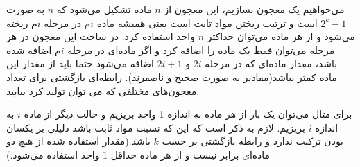 \p 
    می‌خواهیم یک معجون بسازیم،
    این معجون از 
    $n$
    ماده تشکیل می‌شود که
    $n$
    به صورت
    $2^{k}-1$
    است و ترتیب ریختن مواد ثابت است یعنی همیشه ماده 
    $i$م
    در مرحله 
    $i$م
    ریخته می‌شود
    و از هر ماده می‌توان حداکثر 
    $n$
    واحد استفاده کرد.
    در ساخت این معجون در هر مرحله می‌توان فقط یک ماده را اضافه کرد و اگر ماده‌ای در مرحله
    $i‌$م
    اضافه شده باشد، مقدار ماده‌ای که در مرحله 
    $2i$
    و
    $2i+1$
    اضافه می‌شود حتما باید از مقدار این ماده کمتر نباشد(مقادیر به صورت صحیح و ناصفرند).
    رابطه‌ای بازگشتی برای تعداد معجون‌های مختلفی که می توان تولید کرد بیابید.


    برای مثال می‌توان یک بار از هر ماده به اندازه 1 واحد بریزیم و حالت دیگر از ماده
    $i$ به اندازه $i$ بریزیم. لازم به ذکر است که این که نسبت مواد ثابت باشد دلیلی بر یکسان بودن ترکیب ندارد و رابطه بازگشتی بر حسب $k$ باشد.(مقدار استفاده شده از هیچ دو ماده‌ای برابر نیست و از هر ماده حداقل $1$ واحد استفاده می‌شود.)
